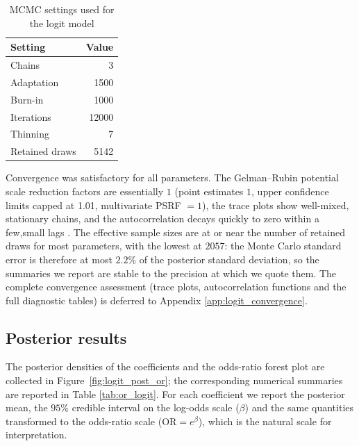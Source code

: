\begin{table}[htbp]
  \centering
  \begin{minipage}[t]{0.34\textwidth}
    \vspace{0pt}   %
    \small
    \centering
    \begin{tabular}{lr}
      \toprule
      Setting & Value \\
      \midrule
      Chains            & 3 \\
      Adaptation        & 1500 \\
      Burn-in           & 1000 \\
      Iterations        & 12000 \\
      Thinning          & 7 \\
      Retained draws    & 5142 \\
      \bottomrule
    \end{tabular}
    \caption{MCMC settings used for the logit model}
    \label{tab:mcmc_settings}
  \end{minipage}
  \hfill
  \begin{minipage}[t]{0.62\textwidth}
    \vspace{0pt}
    Convergence was satisfactory for all parameters. The Gelman--Rubin \cite{bl_book} potential
    scale reduction factors are essentially $1$ (point estimates $1$,
    upper confidence limits capped at 1.01, multivariate PSRF $= 1$), the trace
    plots show well-mixed, stationary chains, and
    the autocorrelation decays quickly to zero within a few,small lags . The
    effective sample sizes are at or near the number of retained draws for most
    parameters, with the lowest at $2057$: the Monte Carlo standard error is
    therefore at most $2.2\%$ of the posterior standard deviation, so the summaries
    we report are stable to the precision at which we quote them. The complete convergence assessment
    (trace plots, autocorrelation functions and the full diagnostic tables) is
    deferred to Appendix \ref{app:logit_convergence}.
  \end{minipage}
\end{table}

\subsection{Posterior results}
The posterior densities of the coefficients and the odds-ratio forest plot are
collected in Figure~\ref{fig:logit_post_or}; the corresponding numerical
summaries are reported in Table \ref{tab:or_logit}. For each coefficient we report the
posterior mean, the $95\%$ credible interval on the log-odds scale
($\beta$) and the same quantities transformed to the odds-ratio scale
($\text{OR} = e^{\beta}$), which is the natural scale for interpretation.

